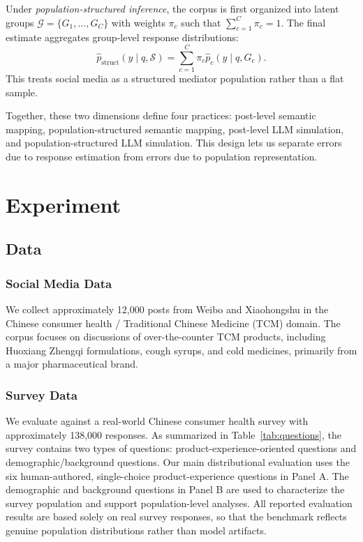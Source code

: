 \documentclass{article}
\begin{document}
Under \emph{population-structured inference}, the corpus is first organized into latent groups
$\mathcal{G}=\{G_1,\ldots,G_C\}$ with weights $\pi_c$ such that $\sum_{c=1}^{C}\pi_c=1$.
The final estimate aggregates group-level response distributions:
\[
\hat{p}_{\mathrm{struct}}(y \mid q,\mathcal{S})
=
\sum_{c=1}^{C} \pi_c \hat{p}_c(y \mid q,G_c).
\]
This treats social media as a structured mediator population rather than a flat sample.

Together, these two dimensions define four practices:
post-level semantic mapping, population-structured semantic mapping,
post-level LLM simulation, and population-structured LLM simulation.
This design lets us separate errors due to response estimation from errors due to population representation.

\section{Experiment}
\label{sec:experiment}

\subsection{Data}

\subsubsection{Social Media Data}
We collect approximately 12,000 posts from Weibo and Xiaohongshu in the Chinese consumer health / Traditional Chinese Medicine (TCM) domain.
The corpus focuses on discussions of over-the-counter TCM products,
including Huoxiang Zhengqi formulations, cough syrups, and cold medicines,
primarily from a major pharmaceutical brand.

\subsubsection{Survey Data}
We evaluate against a real-world Chinese consumer health survey with approximately 138,000 responses.
As summarized in Table~\ref{tab:questions}, the survey contains two types of questions:
product-experience-oriented questions and demographic/background questions.
Our main distributional evaluation uses the six human-authored, single-choice product-experience questions in Panel A.
The demographic and background questions in Panel B are used to characterize the survey population and support population-level analyses.
All reported evaluation results are based solely on real survey responses, so that the benchmark reflects genuine population distributions rather than model artifacts.
\end{document}
